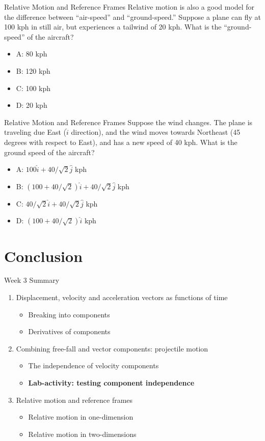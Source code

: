 \documentclass{beamer}
\begin{document}
\begin{frame}{Relative Motion and Reference Frames}
\small
Relative motion is also a good model for the difference between ``air-speed'' and ``ground-speed.''  Suppose a plane can fly at 100 kph in still air, but experiences a tailwind of 20 kph.  What is the ``ground-speed'' of the aircraft?
\begin{itemize}
\item A: 80 kph
\item B: 120 kph
\item C: 100 kph
\item D: 20 kph
\end{itemize}
\end{frame}

\begin{frame}{Relative Motion and Reference Frames}
\small
Suppose the wind changes.  The plane is traveling due East ($\hat{i}$ direction), and the wind moves towards Northeast (45 degrees with respect to East), and has a new speed of 40 kph.  What is the ground speed of the aircraft?
\begin{itemize}
\item A: $100\hat{i} + 40/\sqrt{2}\hat{j}$  kph
\item B: $(100+40/\sqrt{2})\hat{i} + 40/\sqrt{2}\hat{j}$  kph
\item C: $40/\sqrt{2}\hat{i} + 40/\sqrt{2}\hat{j}$  kph
\item D: $(100+40/\sqrt{2})\hat{i}$  kph
\end{itemize}
\end{frame}

\section{Conclusion}

\begin{frame}{Week 3 Summary}
\begin{enumerate}
\item Displacement, velocity and acceleration vectors \alert{as functions of time}
\begin{itemize}
\item Breaking into components
\item Derivatives of components
\end{itemize}
\item Combining free-fall and vector components: \alert{projectile motion}
\begin{itemize}
\item The independence of velocity components
\item \textbf{Lab-activity: testing component independence}
\end{itemize}
\item Relative motion and reference frames
\begin{itemize}
\item Relative motion in one-dimension
\item Relative motion in two-dimensions
\end{itemize}
\end{enumerate}
\end{frame}
\end{document}
